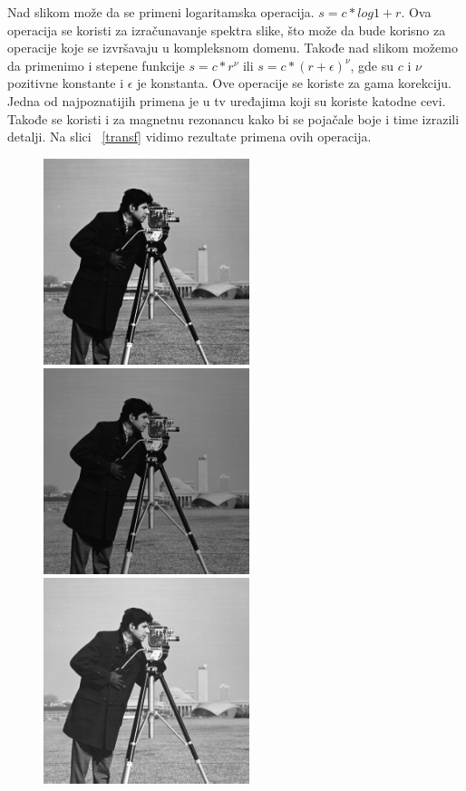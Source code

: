 \documentclass[a4paper,12pt,titlepage]{article}
\begin{document}
Nad slikom može da se primeni logaritamska operacija. $s = c*log{1+ r}$. Ova operacija se koristi za izračunavanje spektra slike, što može da bude korisno za operacije koje se izvršavaju u kompleksnom domenu. Takođe nad slikom možemo da primenimo i stepene funkcije $s = c*r^{\nu}$ ili $s = c*(r + \epsilon)^{\nu}$, gde su $c$ i $\nu$ pozitivne konstante i $\epsilon$ je konstanta. Ove operacije se koriste za gama korekciju. Jedna od najpoznatijih primena je u tv uređajima koji su koriste katodne cevi. Takođe se koristi i za magnetnu rezonancu kako bi se pojačale boje i time izrazili detalji. Na slici ~\ref{transf} vidimo rezultate primena ovih operacija.

\begin{figure}[ht!]
\centering
\includegraphics[width=60mm]{img/img.png}
\includegraphics[width=60mm]{img/imgLog.png}
\includegraphics[width=60mm]{img/imgPow1.png}

\end{figure}
\end{document}

